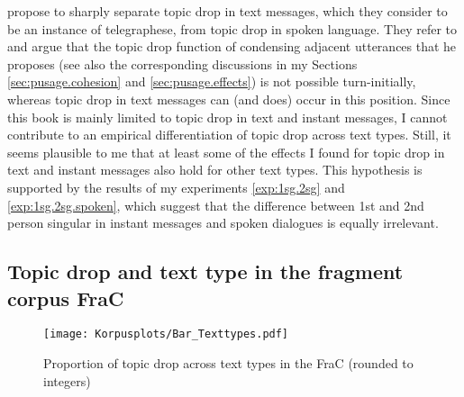 \citet[24--25]{dittmann.etal2007} propose to sharply separate topic drop in text messages, which they consider to be an instance of telegraphese, from topic drop in spoken language.
They refer to \citet{auer1993} and argue that the topic drop function of condensing adjacent utterances that he proposes (see also the corresponding discussions in my Sections \ref{sec:pusage.cohesion} and \ref{sec:pusage.effects}) is not possible turn-initially, whereas topic drop in text messages can (and does) occur in this position.
Since this book is mainly limited to topic drop in text and instant messages, I cannot contribute to an empirical differentiation of topic drop across text types. 
Still, it seems plausible to me that at least some of the effects I found for topic drop in text and instant messages also hold for other text types.
This hypothesis is supported by the results of my experiments \ref*{exp:1sg.2sg} and \ref*{exp:1sg.2sg.spoken}, which suggest that the difference between 1st and 2nd person singular in instant messages and spoken dialogues is equally irrelevant.

\subsection{Topic drop and text type in the fragment corpus FraC}\label{sec:corpus.texttype}
\largerpage[-2]
\begin{figure}
\centering
\texttt{[image: Korpusplots/Bar\_Texttypes.pdf]}
\caption[Proportion of topic drop across text types in the FraC (rounded to integers)]{Proportion of topic drop across text types in the FraC (rounded to integers)}
\label{fig:frac.texttypes}
\end{figure}

